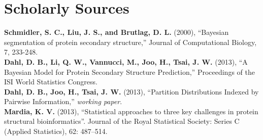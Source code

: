 \documentclass{article}
\begin{document}
\section*{\normalsize Scholarly Sources}
  \textbf{Schmidler, S. C., Liu, J. S., and Brutlag, D. L.} (2000), ``Bayesian segmentation of protein secondary structure,'' Journal of Computational Biology, 7, 233-248.\\
  \textbf{Dahl, D. B., Li, Q. W., Vannucci, M., Joo, H., Tsai, J. W.} (2013), ``A Bayesian Model for Protein Secondary Structure Prediction,'' Proceedings of the ISI World Statistics Congress.\\
  \textbf{Dahl, D. B., Joo, H., Tsai, J. W.} (2013), ``Partition Distributions Indexed by Pairwise Information,'' \textit{working paper}.\\
  \textbf{Mardia, K. V.} (2013), ``Statistical approaches to three key challenges in protein structural bioinformatics''. Journal of the Royal Statistical Society: Series C (Applied Statistics), 62: 487–514.
\end{document}
